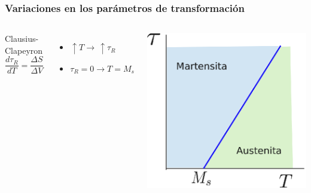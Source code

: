 \documentclass[usenames,dvipsnames]{beamer}
\begin{document}
\begin{frame}
\frametitle{Variaciones en los parámetros de transformación}

\begin{columns}

\begin{block}{Clausius-Clapeyron}
\begin{equation*}
 \frac{d \tau_{R}}{dT}=\frac{\Delta S}{\Delta V} 
\end{equation*}
\end{block}

\begin{itemize}
 \item $\uparrow T \rightarrow \, \uparrow \tau_{R}$
 \item $\tau_{R} = 0  \rightarrow T=M_{s}$
\end{itemize}

\includegraphics[width=\columnwidth]{img/intro/Clapeyron.eps}

\end{columns}

\begin{figure}
\end{figure}


\end{frame}
\end{document}
